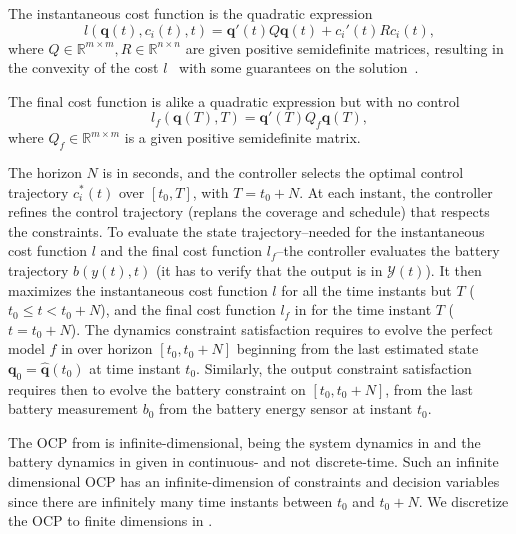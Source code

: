The instantaneous cost function is the quadratic expression
\begin{equation}\label{eq:insta-cost-mpc}
  l(\mathbf{q}(t),c_i(t),t)=\mathbf{q}'(t)Q\mathbf{q}(t)+c_i'(t)Rc_i(t),
\end{equation}
where $Q\in\mathbb{R}^{m\times m},R\in\mathbb{R}^{n\times n}$ are given positive semidefinite matrices, resulting in the convexity of the cost $l$~\citep{nocedal2006numerical} with some guarantees on the solution~\citep{beck2014introduction}.

The final cost function is alike a quadratic expression but with no control
\begin{equation}\label{eq:final-cost-mpc}
  l_f(\mathbf{q}(T),T)=\mathbf{q}'(T)Q_f\mathbf{q}(T),
\end{equation}
where $Q_f\in\mathbb{R}^{m\times m}$ is a given positive semidefinite matrix. %

The horizon $N$ is in seconds, and the controller selects the optimal control trajectory $c_i^*(t)$ over $[t_0,T]$, with $T=t_0+N$. At each instant, the controller refines the control trajectory (replans the coverage and schedule) that respects the constraints. To evaluate the state trajectory--needed for the instantaneous cost function $l$ and the final cost function $l_f$--the controller evaluates the battery trajectory $b(y(t),t)$ (it has to verify that the output is in $\mathcal{Y}(t)$). It then maximizes the instantaneous cost function $l$ for all the time instants but $T$ ($t_0\leq t < t_0+N$), and the final cost function $l_f$ in  for the time instant $T$ ($t=t_0+N$).
The dynamics constraint satisfaction requires to evolve the perfect model $f$ in  over horizon $[t_0,t_0+N]$ beginning from the last estimated state $\mathbf{q}_0=\hat{\mathbf{q}}(t_0)$ at time instant $t_0$. Similarly, the output constraint satisfaction requires then to evolve the battery constraint on $[t_0,t_0+N]$, from the last battery measurement $b_0$ from the battery energy sensor at instant $t_0$.

The OCP from  is infinite-dimensional, being the system dynamics in  and the battery dynamics in  given in continuous- and not discrete-time. Such an infinite dimensional OCP has an infinite-dimension of constraints and decision variables since there are infinitely many time instants between $t_0$ and $t_0+N$. We discretize the OCP to finite dimensions in .

